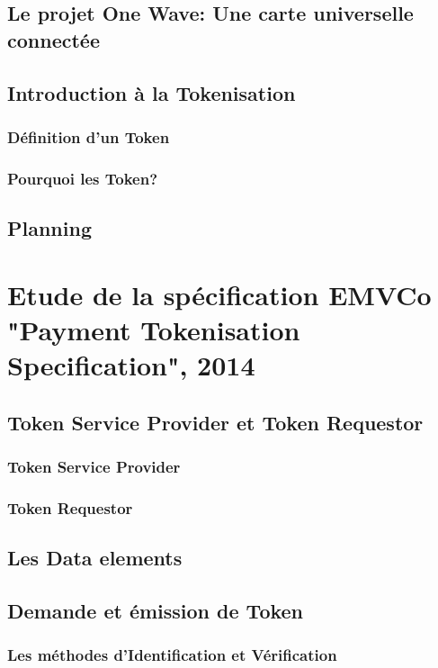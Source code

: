 \documentclass{rapportDeProjetENSICAEN}
\begin{document}
\section{Le projet One Wave: Une carte universelle connectée}

\section{Introduction à la Tokenisation}
\subsection{Définition d'un Token}
\subsection{Pourquoi les Token?}

\section{Planning}


\chapter{Etude de la spécification EMVCo "Payment Tokenisation Specification", 2014}

\section{Token Service Provider et Token Requestor}
\subsection{Token Service Provider}
\subsection{Token Requestor}

\section{Les Data elements}

\section{Demande et émission de Token}
\subsection{Les méthodes d'Identification et Vérification}
\end{document}
